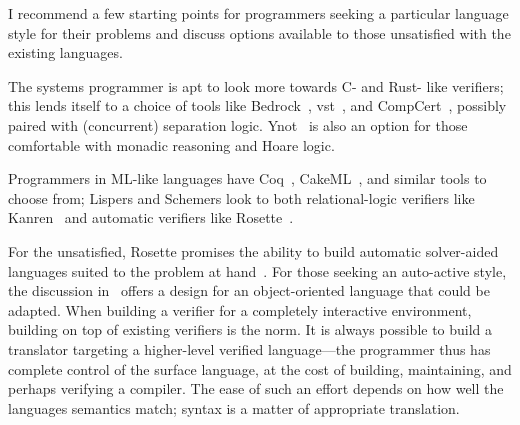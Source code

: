 I recommend a few starting points for programmers seeking a particular language
style for their problems and discuss options available to those unsatisfied with
the existing languages.

The systems programmer is apt to look more towards C- and Rust- like verifiers; this
lends itself to a choice of tools like Bedrock~\cite{Chlipala_2011},
\gls{vst}~\cite{VST}, and CompCert~\cite{Kastner-LBSSF-2017}, possibly paired
with (concurrent) separation logic. Ynot~\cite{Nanevski08ynot:reasoning} is also
an option for those comfortable with monadic reasoning and Hoare logic.

Programmers in ML-like languages have Coq~\cite{Coq}, CakeML~\cite{Kumar_2014},
and similar tools to choose from; Lispers and Schemers look to both
relational-logic verifiers like Kanren~\cite{Byrd_2009} and automatic verifiers
like Rosette~\cite{Rosette}.

For the unsatisfied, Rosette promises the ability to build automatic
solver-aided languages suited to the problem at hand~\cite{Torlak_2013}. For
those seeking an auto-active style, the discussion
in~\cite{leino2008specification} offers a design for an object-oriented language
that could be adapted. When building a verifier for a completely interactive
environment, building on top of existing verifiers is the norm. It is always
possible to build a translator targeting a higher-level verified language---the
programmer thus has complete control of the surface language, at the cost of
building, maintaining, and perhaps verifying a compiler. The ease of such an
effort depends on how well the languages semantics match; syntax is a matter of
appropriate translation.
